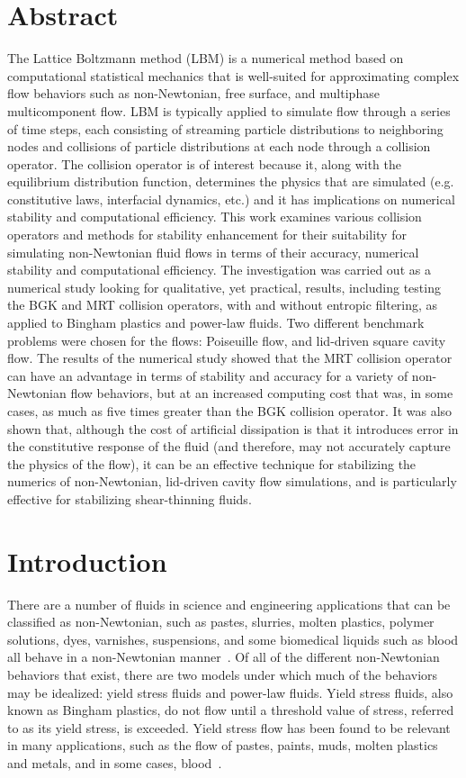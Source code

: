 \section*{Abstract}

The Lattice Boltzmann method (LBM) is a numerical method based on computational statistical mechanics that is well-suited for approximating complex flow behaviors such as non-Newtonian, free surface, and multiphase multicomponent flow.
LBM is typically applied to simulate flow through a series of time steps, each consisting of streaming particle distributions to neighboring nodes and collisions of particle distributions at each node through a collision operator.
The collision operator is of interest because it, along with the equilibrium distribution function, determines the physics that are simulated (e.g. constitutive laws, interfacial dynamics, etc.) and it has implications on numerical stability and computational efficiency.
This work examines various collision operators and methods for stability enhancement for their suitability for simulating non-Newtonian fluid flows in terms of their accuracy, numerical stability and computational efficiency.
The investigation was carried out as a numerical study looking for qualitative, yet practical, results, including testing the BGK and MRT collision operators, with and without entropic filtering, as applied to Bingham plastics and power-law fluids.
Two different benchmark problems were chosen for the flows: Poiseuille flow, and lid-driven square cavity flow.
The results of the numerical study showed that the MRT collision operator can have an advantage in terms of stability and accuracy for a variety of non-Newtonian flow behaviors, but at an increased computing cost that was, in some cases, as much as five times greater than the BGK collision operator.
It was also shown that, although the cost of artificial dissipation is that it introduces error in the constitutive response of the fluid (and therefore, may not accurately capture the physics of the flow), it can be an effective technique for stabilizing the numerics of non-Newtonian, lid-driven cavity flow simulations, and is particularly effective for stabilizing shear-thinning fluids.

\section{Introduction}

There are a number of fluids in science and engineering applications that can be classified as non-Newtonian, such as pastes, slurries, molten plastics, polymer solutions, dyes, varnishes, suspensions, and some biomedical liquids such as blood all behave in a non-Newtonian manner~\cite{bohme1987non}.
Of all of the different non-Newtonian behaviors that exist, there are two models under which much of the behaviors may be idealized: yield stress fluids and power-law fluids.
Yield stress fluids, also known as Bingham plastics, do not flow until a threshold value of stress, referred to as its yield stress, is exceeded.
Yield stress flow has been found to be relevant in many applications, such as the flow of pastes, paints, muds, molten plastics and metals, and in some cases, blood~\cite{wang2011lattice}.

